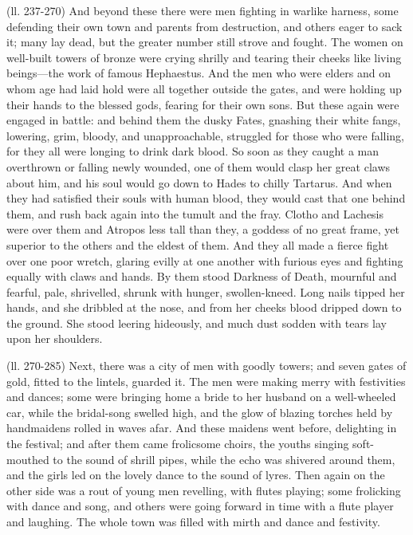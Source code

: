 (ll. 237-270) And beyond these there were men fighting in warlike harness, some
defending their own town and parents from destruction, and others eager to sack
it; many lay dead, but the greater number still strove and fought. The women on
well-built towers of bronze were crying shrilly and tearing their cheeks like
living beings—the work of famous Hephaestus. And the men who were elders
and on whom age had laid hold were all together outside the gates, and were
holding up their hands to the blessed gods, fearing for their own sons. But
these again were engaged in battle: and behind them the dusky Fates, gnashing
their white fangs, lowering, grim, bloody, and unapproachable, struggled for
those who were falling, for they all were longing to drink dark blood. So soon
as they caught a man overthrown or falling newly wounded, one of them would
clasp her great claws about him, and his soul would go down to Hades to chilly
Tartarus. And when they had satisfied their souls with human blood, they would
cast that one behind them, and rush back again into the tumult and the fray.
Clotho and Lachesis were over them and Atropos less tall than they, a goddess
of no great frame, yet superior to the others and the eldest of them. And they
all made a fierce fight over one poor wretch, glaring evilly at one another
with furious eyes and fighting equally with claws and hands. By them stood
Darkness of Death, mournful and fearful, pale, shrivelled, shrunk with hunger,
swollen-kneed. Long nails tipped her hands, and she dribbled at the nose, and
from her cheeks blood dripped down to the ground. She stood leering hideously,
and much dust sodden with tears lay upon her shoulders.

(ll. 270-285) Next, there was a city of men with goodly towers; and seven gates
of gold, fitted to the lintels, guarded it. The men were making merry with
festivities and dances; some were bringing home a bride to her husband on a
well-wheeled car, while the bridal-song swelled high, and the glow of blazing
torches held by handmaidens rolled in waves afar. And these maidens went
before, delighting in the festival; and after them came frolicsome choirs, the
youths singing soft-mouthed to the sound of shrill pipes, while the echo was
shivered around them, and the girls led on the lovely dance to the sound of
lyres. Then again on the other side was a rout of young men revelling, with
flutes playing; some frolicking with dance and song, and others were going
forward in time with a flute player and laughing. The whole town was filled
with mirth and dance and festivity.

